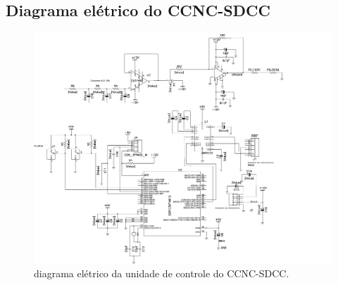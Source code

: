 \documentclass[12pt,a4paper,oneside,final]{book}
\begin{document}

%

%
%

%

\begin{appendices}
    
    
    
     \chapter{Diagrama el\'{e}trico do CCNC-SDCC}

\newpage
\begin{figure}[!hbt]
    \begin{center}
        \includegraphics[bb=1.0in 12.0in 7.5in 10in,scale=0.9]{eps/ccncsch.pdf}
    \end{center}
    \caption{\label{ccncsch}\hspace{-0.1em} diagrama el\'{e}trico da unidade de controle do CCNC-SDCC.}
\end{figure}



\end{appendices}
\end{document}
